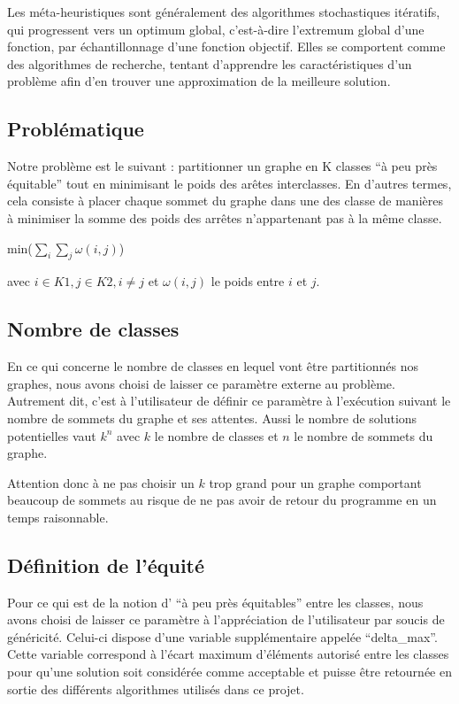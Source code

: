 \documentclass[a4paper]{article}
\begin{document}
Les méta-heuristiques sont généralement des algorithmes stochastiques itératifs, qui progressent vers un optimum global, c'est-à-dire l'extremum global d'une fonction, par échantillonnage d’une fonction objectif. Elles se comportent comme des algorithmes de recherche, tentant d’apprendre les caractéristiques d’un problème afin d’en trouver une approximation de la meilleure solution.

\subsection{Problématique}
Notre problème est le suivant : partitionner un graphe en K classes ``à peu près équitable'' tout en minimisant le poids des arêtes interclasses. En d'autres termes, cela consiste à placer chaque sommet du graphe dans une des classe de manières à minimiser la somme des poids des arrêtes n'appartenant pas à la même classe.
\begin{center}
min($\sum\limits_{i} \sum\limits_{j}  \omega (i,j)$)
\end{center}
avec $i \in K1, j \in K2, i \ne j$ et $\omega (i,j)$ le poids entre $i$ et $j$.

\subsection{Nombre de classes}
En ce qui concerne le nombre de classes en lequel vont être partitionnés nos graphes, nous avons choisi de laisser ce paramètre externe au problème. Autrement dit, c'est à l'utilisateur de définir ce paramètre à l’exécution suivant le nombre de sommets du graphe et ses attentes.
Aussi le nombre de solutions potentielles vaut $k^n$ avec $k$ le nombre de classes et $n$ le nombre de sommets du graphe. 

Attention donc à ne pas choisir un $k$ trop grand pour un graphe comportant beaucoup de sommets au risque de ne pas avoir de retour du programme en un temps raisonnable. 

\subsection{Définition de l'équité}

Pour ce qui est de la notion d' ``à peu près équitables'' entre les classes, nous avons choisi de laisser ce paramètre à l'appréciation de l'utilisateur par soucis de généricité. Celui-ci dispose d'une variable supplémentaire appelée ``delta\_max''. Cette variable correspond à l'écart maximum d'éléments autorisé entre les classes pour qu'une solution soit considérée comme acceptable et puisse être retournée en sortie des différents algorithmes utilisés dans ce projet.
\end{document}
